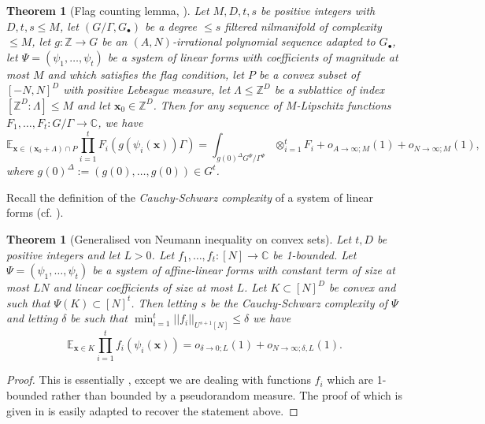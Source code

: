 \documentclass[10pt]{article}
\def\Z{\mathbb{Z}}
\def\C{\mathbb{C}}
\def\E{\mathbb{E}}
\newcommand{\vect}[1]{\boldsymbol{#1}}
\newtheorem{thm}[firstthm]{Theorem}
\begin{document}
\begin{thm}[Flag counting lemma, {\cite[Theorem 1.11]{GT10}}]\label{t:cl}
Let $M, D, t, s$ be positive integers with $D,t,s \leq M$, let $(G/\Gamma, G_\bullet)$ be a degree $\leq s$ filtered nilmanifold of complexity $\leq M$,  let $g: \Z \to G$ be an $(A,N)$-irrational polynomial sequence adapted to $G_\bullet$, let $\Psi = (\psi_1,\ldots, \psi_t)$ be a system of linear forms  with coefficients of magnitude at most $M$ and which satisfies the flag condition, let $P$ be a convex subset of $[-N,N]^D$ with positive Lebesgue measure, let $\Lambda \leq \Z^D$ be a sublattice of index $[\Z^D:\Lambda]\leq M$ and let $\vect x_0 \in \Z^D$. Then for any sequence of $M$-Lipschitz functions $F_1,\ldots,F_t: G/\Gamma \to \C$, we have 
\[\E_{\vect x \in (\vect x_0 + \Lambda )\cap P} \prod_{i=1}^t F_i(g(\psi_i(\vect x))\Gamma) =  \int_{g(0)^\Delta G^\Psi/\Gamma^\Psi}\otimes_{i=1}^t F_i + o_{A\to \infty;M}(1) + o_{N \to \infty;M}(1),\]
where $g(0)^\Delta:= (g(0),\ldots, g(0)) \in G^t$.
\end{thm}

Recall the definition of the \textit{Cauchy-Schwarz complexity} of a system of linear forms (cf. \cite[Definition 1.3.2]{T12}). 

\begin{thm}[Generalised von Neumann inequality on convex sets]\label{t:gvN}
Let $t,D$ be positive integers and let $L>0$. Let $f_1, \ldots, f_t:[N] \to \C$ be 1-bounded. Let $\Psi = (\psi_1, \ldots, \psi_t)$ be a system of affine-linear forms with constant term of size at most $LN$ and linear coefficients of size at most $L$. Let $K \subset [N]^D$ be convex and such that $\Psi(K) \subset [N]^t$. Then letting $s$ be the Cauchy-Schwarz complexity of $\Psi$ and letting $\delta$ be such that $\min_{i=1}^t||f_i||_{U^{s+1}[N]} \leq \delta$ we have
\[ \E_{\vect x \in K} \prod_{i=1}^t f_i(\psi_i(\vect x)) = o_{\delta \to 0;L}(1) + o_{N \to \infty;\delta,L}(1).\] 
\end{thm}
\begin{proof} This is essentially \cite[Proposition 7.1]{GT10L}, except we are dealing with functions $f_i$ which are 1-bounded rather than bounded by a pseudorandom measure. The proof of  \cite[Proposition 7.1]{GT10L} which is given in  \cite[Appendix C]{GT10L} is easily adapted to recover the statement above.
\end{proof}
\end{document}
